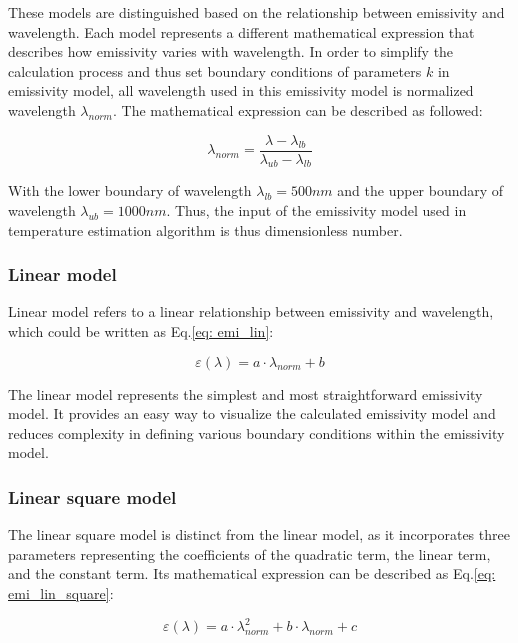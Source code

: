These models are distinguished based on the relationship between 
emissivity and wavelength. Each model represents a different 
mathematical expression that describes how emissivity varies with 
wavelength. In order to simplify the calculation process and thus set 
boundary conditions of parameters $k$ in emissivity model, all wavelength 
used in this emissivity model is normalized wavelength $\lambda_{norm}$. The 
mathematical expression can be described as followed:

\begin{equation}
  \label{eq: wavelength_norm}
  \lambda_{norm} = \frac{\lambda - \lambda_{lb}}{\lambda_{ub} - \lambda_{lb}}
\end{equation}

With the lower boundary of wavelength $\lambda_{lb} = 500 {nm}$ and the 
upper boundary of wavelength $\lambda_{ub} = 1000 {nm}$. Thus, the input 
of the emissivity model used in temperature estimation algorithm is thus 
dimensionless number.

\subsubsection{Linear model}
Linear model refers to a linear relationship between emissivity and wavelength,
which could be written as Eq.\ref{eq: emi_lin}:

\begin{equation}
  \label{eq: emi_lin}
  \varepsilon(\lambda) = a\cdot \lambda_{norm} + b
\end{equation}

The linear model represents the simplest and most straightforward emissivity model. 
It provides an easy way to visualize the calculated emissivity model 
and reduces complexity in defining various boundary conditions within the 
emissivity model.

\subsubsection{Linear square model}
The linear square model is distinct from the linear model, 
as it incorporates three parameters representing the coefficients 
of the quadratic term, the linear term, and the constant term. Its 
mathematical expression can be described as Eq.\ref{eq: emi_lin_square}:

\begin{equation}
  \label{eq: emi_lin_square}
  \varepsilon(\lambda) = a \cdot \lambda_{norm}^2 + b \cdot \lambda_{norm} + c
\end{equation}

